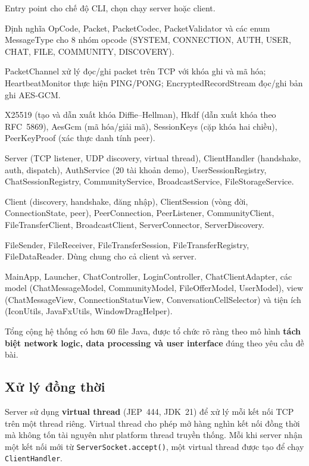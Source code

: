 \begin{description}[leftmargin=0cm,style=nextline]
\item[\texttt{app/}] Entry point cho chế độ CLI, chọn chạy server hoặc client.
\item[\texttt{protocols/}] Định nghĩa OpCode, Packet, PacketCodec, PacketValidator và các enum MessageType cho 8 nhóm opcode (SYSTEM, CONNECTION, AUTH, USER, CHAT, FILE, COMMUNITY, DISCOVERY).
\item[\texttt{network/}] PacketChannel xử lý đọc/ghi packet trên TCP với khóa ghi và mã hóa; HeartbeatMonitor thực hiện PING/PONG; EncryptedRecordStream đọc/ghi bản ghi AES-GCM.
\item[\texttt{security/}] X25519 (tạo và dẫn xuất khóa Diffie--Hellman), Hkdf (dẫn xuất khóa theo RFC~5869), AesGcm (mã hóa/giải mã), SessionKeys (cặp khóa hai chiều), PeerKeyProof (xác thực danh tính peer).
\item[\texttt{server/}] Server (TCP listener, UDP discovery, virtual thread), ClientHandler (handshake, auth, dispatch), AuthService (20 tài khoản demo), UserSessionRegistry, ChatSessionRegistry, CommunityService, BroadcastService, FileStorageService.
\item[\texttt{client/}] Client (discovery, handshake, đăng nhập), ClientSession (vòng đời, ConnectionState, peer), PeerConnection, PeerListener, CommunityClient, FileTransferClient, BroadcastClient, ServerConnector, ServerDiscovery.
\item[\texttt{transfer/}] FileSender, FileReceiver, FileTransferSession, FileTransferRegistry, FileDataReader. Dùng chung cho cả client và server.
\item[\texttt{ui/}] MainApp, Launcher, ChatController, LoginController, ChatClientAdapter, các model (ChatMessageModel, CommunityModel, FileOfferModel, UserModel), view (ChatMessageView, ConnectionStatusView, ConversationCellSelector) và tiện ích (IconUtils, JavaFxUtils, WindowDragHelper).
\end{description}

Tổng cộng hệ thống có hơn 60 file Java, được tổ chức rõ ràng theo mô hình \textbf{tách biệt network logic, data processing và user interface} đúng theo yêu cầu đề bài.

\subsection{Xử lý đồng thời}

Server sử dụng \textbf{virtual thread} (JEP~444, JDK~21) để xử lý mỗi kết nối TCP trên một thread riêng. Virtual thread cho phép mở hàng nghìn kết nối đồng thời mà không tốn tài nguyên như platform thread truyền thống. Mỗi khi server nhận một kết nối mới từ \texttt{ServerSocket.accept()}, một virtual thread được tạo để chạy \texttt{ClientHandler}.

